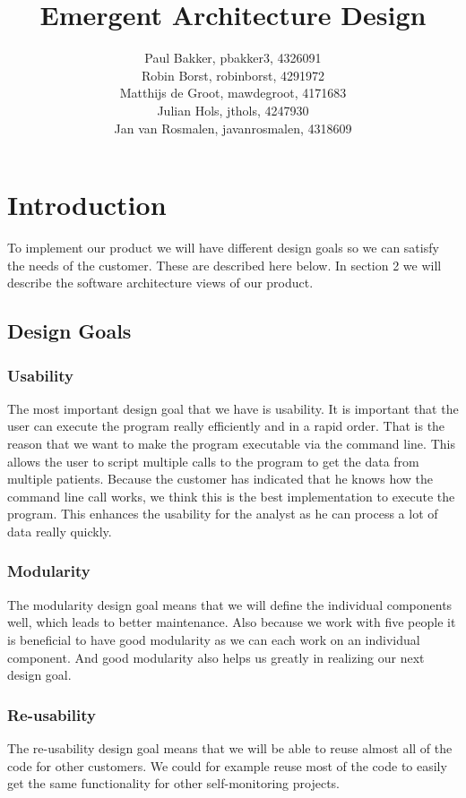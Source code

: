 \documentclass[11pt,twoside,a4paper]{article}
\title{Emergent Architecture Design}
\author{
	Paul Bakker, pbakker3, 4326091 \\
    Robin Borst, robinborst, 4291972 \\
    Matthijs de Groot, mawdegroot, 4171683 \\
    Julian Hols, jthols, 4247930\\
    Jan van Rosmalen, javanrosmalen, 4318609\\
}
\begin{document}
\maketitle
\newpage
\tableofcontents
\newpage

\section{Introduction}

To implement our product we will have different design goals so we can satisfy the needs of the customer. These are described here below. In section 2 we will describe the software architecture views of our product.

\subsection{Design Goals}
\subsubsection{Usability}
The most important design goal that we have is usability. It is important that the user can execute the program really efficiently and in a rapid order. That is the reason that we want to make the program executable via the command line. This allows the user to script multiple calls to the program to get the data from multiple patients. Because the customer has indicated that he knows how the command line call works, we think this is the best implementation to execute the program. This enhances the usability for the analyst as he can process a lot of data really quickly.
\subsubsection{Modularity}
The modularity design goal means that we will define the individual components well, which leads to better maintenance. Also because we work with five people it is beneficial to have good modularity as we can each work on an individual component. And good modularity also helps us greatly in realizing our next design goal.
\subsubsection{Re-usability}
The re-usability design goal means that we will be able to reuse almost all of the code for other customers. We could for example reuse most of the code to easily get the same functionality for other self-monitoring projects.
\end{document}
